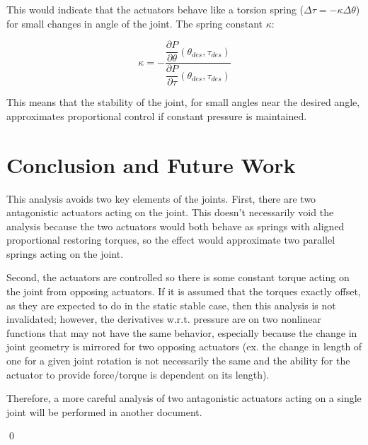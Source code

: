 \documentclass[12pt, letterpaper, oneside, notitlepage, onecolumn]{article}
\begin{document}
This would indicate that the actuators behave like a torsion spring ($\Delta \tau =
-\kappa \Delta \theta$) for small changes in angle of the joint. The spring constant $\kappa$:

\begin{equation}
\kappa
=
- \dfrac{\dfrac{\partial P}{\partial \theta}(\theta_{des}, \tau_{des})}{
\dfrac{\partial P}{\partial \tau}(\theta_{des}, \tau_{des})}
\end{equation}

This means that the stability of the joint, for small angles near the desired
angle, approximates proportional control if constant pressure is maintained.

\section{Conclusion and Future Work}

This analysis avoids two key elements of the joints. First, there are two
antagonistic actuators acting on the joint. This doesn't necessarily void the
analysis because the two actuators would both behave as springs with aligned
proportional restoring torques, so the effect would approximate two parallel
springs acting on the joint.

Second, the actuators are controlled so there is some constant torque acting on
the joint from opposing actuators. If it is assumed that the torques exactly
offset, as they are expected to do in the static stable case, then this analysis
is not invalidated; however, the derivatives w.r.t. pressure are on two
nonlinear functions that may not have the same behavior, especially because the
change in joint geometry is mirrored for two opposing actuators (ex. the change
in length of one for a given joint rotation is not necessarily the same and the
ability for the actuator to provide force/torque is dependent on its length).

Therefore, a more careful analysis of two antagonistic actuators acting on a
single joint will be performed in another document.

\qed
\end{document}

